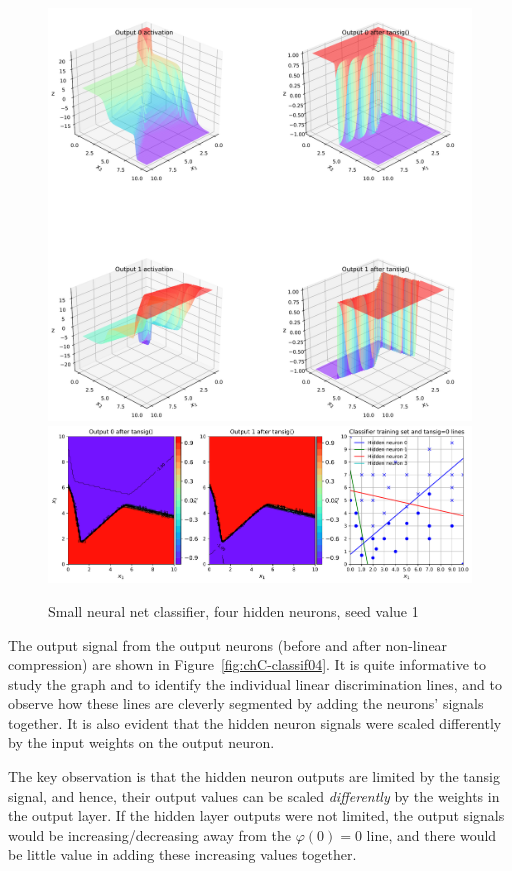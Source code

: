   
\begin{figure}[p]
\centering
\includegraphics[width=\textwidth]{pic/chC-classifa05}
\includegraphics[width=\textwidth]{pic/chC-classifb05}
\caption{Small neural net classifier, four hidden neurons, seed value 1\label{fig:chC-classif05}}
\end{figure}

The output signal from the output neurons (before and after non-linear compression) are shown in Figure~\ref{fig:chC-classif04}.   It is quite informative to study the graph and to identify the individual linear discrimination lines, and to observe how these lines are cleverly segmented by adding the neurons' signals together.   It is also evident that the hidden neuron signals  were scaled differently by the input weights on the output neuron.  

The key observation is that the hidden neuron outputs are limited by the tansig signal, and hence, their output values can be scaled \textit{differently} by the weights in the output layer.  If the hidden layer outputs were not limited, the output signals would be  increasing/decreasing away from the $\varphi(0)=0$  line, and there would be little value in adding these increasing values together. 

